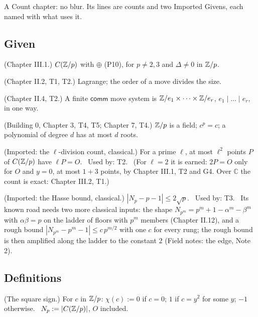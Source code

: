 A Count chapter: no blur. Its lines are counts and two Imported Givens, each named with what uses it.

\subsection*{Given}

\begin{lines}
\item[\lab{G1}] (Chapter III.1.) $C(\mathbb{Z}/p)$ with $\oplus$ (P10), for $p \ne 2, 3$ and $\Delta \ne 0$ in $\mathbb{Z}/p$.
\item[\lab{G2}] (Chapter II.2, T1, T2.) Lagrange; the order of a move divides the size.
\item[\lab{G3}] (Chapter II.4, T2.) A finite $\mathsf{comm}$ move system is $\mathbb{Z}/e_1 \times \dots \times \mathbb{Z}/e_r$, $e_1 \mid \dots \mid e_r$, in one way.
\item[\lab{G4}] (Building 0, Chapter 3, T4, T5; Chapter 7, T4.) $\mathbb{Z}/p$ is a field; $c^{p} = c$; a polynomial of degree $d$ has at most $d$ roots.
\item[\lab{G5}] (Imported: the $\ell$-division count, classical.) For a prime $\ell$, at most $\ell^2$ points $P$ of $C(\mathbb{Z}/p)$ have $\ell P = O$. \ Used by: T2. \ (For $\ell = 2$ it is earned: $2P = O$ only for $O$ and $y = 0$, at most $1 + 3$ points, by Chapter III.1, T2 and G4. Over $\mathbb{C}$ the count is exact: Chapter III.2, T1.)
\item[\lab{G6}] (Imported: the Hasse bound, classical.) $|N_p - p - 1| \le 2\sqrt p$. \ Used by: T3. \ Its known road needs two more classical inputs: the shape $N_{p^m} = p^m + 1 - \alpha^m - \beta^m$ with $\alpha\beta = p$ on the ladder of floors with $p^m$ members (Chapter II.12), and a rough bound $|N_{p^m} - p^m - 1| \le c\,p^{m/2}$ with one $c$ for every rung; the rough bound is then amplified along the ladder to the constant $2$ (Field notes: the edge, Note 2).
\end{lines}

\subsection*{Definitions}

\begin{lines}
\item[\lab{D1}] (The square sign.) For $c$ in $\mathbb{Z}/p$: $\chi(c) := 0$ if $c = 0$; $1$ if $c = y^2$ for some $y$; $-1$ otherwise. \ $N_p := |C(\mathbb{Z}/p)|$, $O$ included.
\end{lines}

